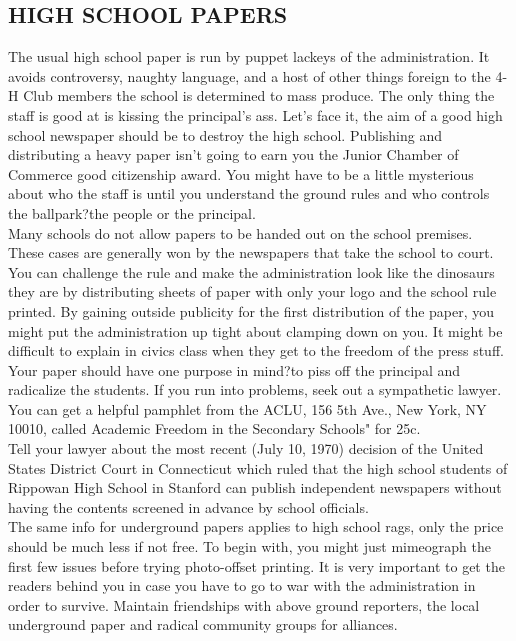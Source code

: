 \documentclass[11pt,twoside,a4paper]{book}
\begin{document}
\subsection{HIGH SCHOOL PAPERS}

The usual high school paper is run by puppet lackeys of the administration. It avoids controversy, naughty language, and a host of other things foreign to the 4-H Club members the school is determined to mass produce. The only thing the staff is good at is kissing the principal's ass. Let's face it, the aim of a good high school newspaper should be to destroy the high school. Publishing and distributing a heavy paper isn't going to earn you the Junior Chamber of Commerce good citizenship award. You might have to be a little mysterious about who the staff is until you understand the ground rules and who controls the ballpark?the people or the principal.~\\

Many schools do not allow papers to be handed out on the school premises. These cases are generally won by the newspapers that take the school to court. You can challenge the rule and make the administration look like the dinosaurs they are by distributing sheets of paper with only your logo and the school rule printed. By gaining outside publicity for the first distribution of the paper, you might put the administration up tight about clamping down on you. It might be difficult to explain in civics class when they get to the freedom of the press stuff. Your paper should have one purpose in mind?to piss off the principal and radicalize the students. If you run into problems, seek out a sympathetic lawyer. You can get a helpful pamphlet from the ACLU, 156 5th Ave., New York, NY 10010, called Academic Freedom in the Secondary Schools" for 25c.~\\

Tell your lawyer about the most recent (July 10, 1970) decision of the United States District Court in Connecticut which ruled that the high school students of Rippowan High School in Stanford can publish independent newspapers without having the contents screened in advance by school officials.~\\

The same info for underground papers applies to high school rags, only the price should be much less if not free. To begin with, you might just mimeograph the first few issues before trying photo-offset printing. It is very important to get the readers behind you in case you have to go to war with the administration in order to survive. Maintain friendships with above ground reporters, the local underground paper and radical community groups for alliances.
\end{document}
